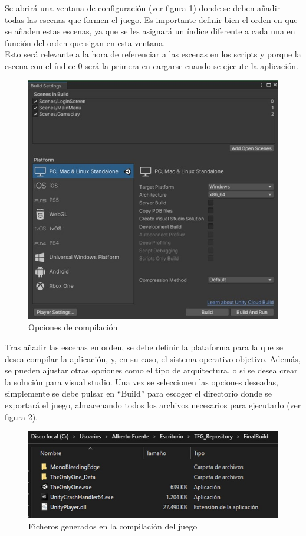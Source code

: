 Se abrirá una ventana de configuración (ver figura \ref{fig:OpcionesCompilacion}) donde se deben añadir todas las escenas que formen el juego. Es importante definir bien el orden en que se añaden estas escenas, ya que se les asignará un índice diferente a cada una en función del orden que sigan en esta ventana. 
\\
Esto será relevante a la hora de referenciar a las escenas en los scripts y porque la escena con el índice 0 será la primera en cargarse cuando se ejecute la aplicación.

\begin{figure}[h]
    \centering
    \includegraphics[scale=0.45]{img/BuildSettings.jpg}
    \caption{Opciones de compilación}
    \label{fig:OpcionesCompilacion}
    \end{figure}
    
Tras añadir las escenas en orden, se debe definir la plataforma para la que se desea compilar la aplicación, y, en su caso, el sistema operativo objetivo. Además, se pueden ajustar otras opciones como el tipo de arquitectura, o si se desea crear la solución para visual studio.
Una vez se seleccionen las opciones deseadas, simplemente se debe pulsar en ``Build'' para escoger el directorio donde se exportará el juego, almacenando todos los archivos necesarios para ejecutarlo (ver figura \ref{fig:FicherosJuego}).

\begin{figure}[h]
    \centering
    \includegraphics[scale=0.45]{img/GeneratedFiles.jpg}
    \caption{Ficheros generados en la compilación del juego}
    \label{fig:FicherosJuego}
    \end{figure}


